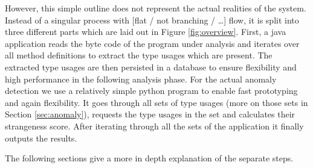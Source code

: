 
However, this simple outline does not represent the actual realities of the system.
Instead of a singular process with [flat / not branching / \ldots] flow, it is split into three different parts which are laid out in Figure \ref{fig:overview}.
First, a java application reads the byte code of the program under analysis and iterates over all method definitions to extract the type usages which are present.
The extracted type usages are then persisted in a database to ensure flexibility and high performance in the following analysis phase.
For the actual anomaly detection we use a relatively simple python program to enable fast prototyping and again flexibility.
It goes through all sets of type usages (more on those sets in Section \ref{sec:anomaly}), requests the type usages in the set and calculates their strangeness score.
After iterating through all the sets of the application it finally outputs the results.

The following sections give a more in depth explanation of the separate steps.

